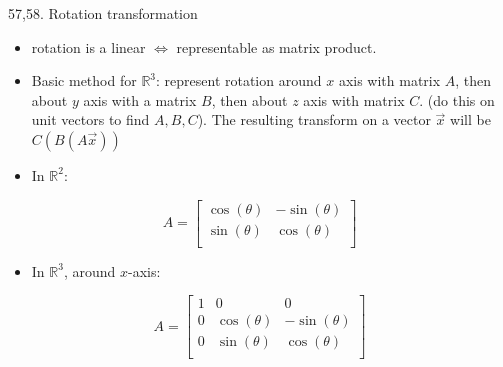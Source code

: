 \documentclass[10pt,letterpaper]{article}
\begin{document}
57,58. Rotation transformation
\begin{itemize}
\item rotation is a linear $\Leftrightarrow$ representable as matrix product.
\item Basic method for $\mathbb{R}^{3}$: represent rotation around $x$ axis with matrix $A$, then about $y$ axis with a matrix $B$, then about $z$ axis with matrix $C$. (do this on unit vectors to find $A, B, C$). The resulting transform on a vector $\vec{x}$ will be $C(B(A \vec{x} ))$
\item In $\mathbb{R}^{2}$:
\end{itemize}
\[
A=
\begin{bmatrix}
  \cos(\theta) & -\sin(\theta) \\
  \sin(\theta) & \cos(\theta)  \\
\end{bmatrix}
\]
\begin{itemize}
\item In $\mathbb{R}^{3}$, around $x$-axis:
\end{itemize}
\[
A=
\begin{bmatrix}
  1 & 0            & 0             \\
  0 & \cos(\theta) & -\sin(\theta) \\
  0 & \sin(\theta) & \cos(\theta)  \\
\end{bmatrix}
\]
\end{document}
